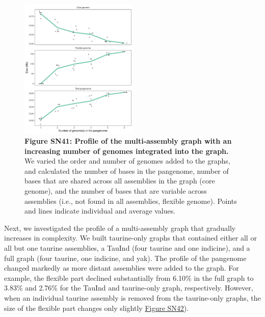 \documentclass[../main.tex]{subfiles}
\begin{document}
\begin{flushleft}
\begin{figure}[!htb]
    \centering
    \includegraphics[width=0.5\textwidth]{paper3/supplement/sp415.pdf}
    \caption*{\textbf{\hypertarget{Figure SN41}{Figure SN41}: Profile of the multi-assembly graph with an increasing number of genomes integrated into the graph.} \\
    \footnotesize{We varied the order and number of genomes added to the graphs, and calculated the number of bases in the pangenome, number of bases that are shared across all assemblies in the graph (core genome), and the number of bases that are variable across assemblies (i.e., not found in all assemblies, flexible genome). Points and lines indicate individual and average values.}}
\end{figure}

\bigskip
Next, we investigated the profile of a multi-assembly graph that gradually increases in complexity. We built taurine-only graphs that contained either all or all but one taurine assemblies, a TauInd (four taurine and one indicine), and a full graph (four taurine, one indicine, and yak). The profile of the pangenome changed markedly as more distant assemblies were added to the graph. For example, the flexible part declined substantially from 6.10\% in the full graph to 3.83\% and 2.76\% for the TauInd and taurine-only graph, respectively. However, when an individual taurine assembly is removed from the taurine-only graphs, the size of the flexible part changes only slightly \hyperlink{Figure SN42}{Figure SN42}).


\end{flushleft}
\end{document}
